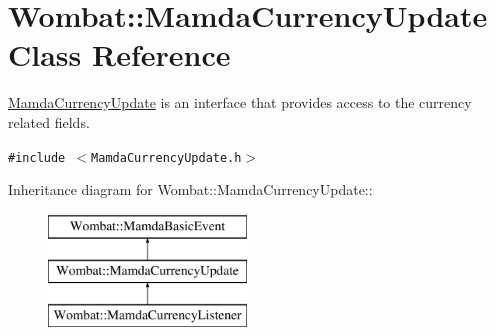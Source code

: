 \hypertarget{classWombat_1_1MamdaCurrencyUpdate}{
\section{Wombat::Mamda\-Currency\-Update Class Reference}
\label{classWombat_1_1MamdaCurrencyUpdate}
}
\hyperlink{classWombat_1_1MamdaCurrencyUpdate}{Mamda\-Currency\-Update} is an interface that provides access to the currency related fields.  


{\tt \#include $<$Mamda\-Currency\-Update.h$>$}

Inheritance diagram for Wombat::Mamda\-Currency\-Update::\begin{figure}[H]
\begin{center}
\leavevmode
\includegraphics[height=3cm]{classWombat_1_1MamdaCurrencyUpdate}
\end{center}
\end{figure}
